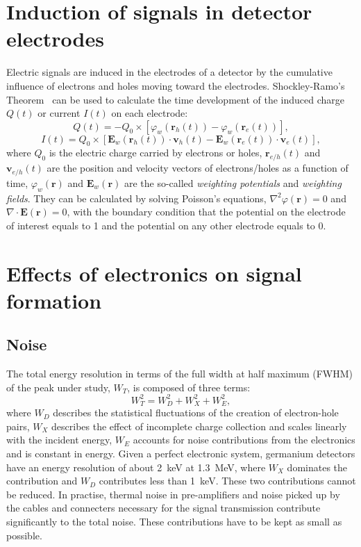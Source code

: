 \section{Induction of signals in detector electrodes}
\label{sec:det:lamo}
Electric signals are induced in the electrodes of a detector by the cumulative influence of electrons and holes moving toward the electrodes. Shockley-Ramo's Theorem~\cite{Gat82, Rad88, He00} can be used to calculate the time development of the induced charge $Q(t)$ or current $I(t)$ on each electrode:
\begin{equation} 
  \label{eq:det:ramoq}
  Q(t) = -Q_{0} \times [\varphi_{w}(\mathbf{r}_{h}(t)) - \varphi_{w}(\mathbf{r}_{e}(t))],
\end{equation}
\begin{equation} 
  \label{eq:det:ramoi}
  I(t) = Q_{0} \times [\mathbf{E}_{w}(\mathbf{r}_{h}(t)) \cdot \mathbf{v}_{h}(t) - \mathbf{E}_{w}(\mathbf{r}_{e}(t)) \cdot \mathbf{v}_{e}(t)],
\end{equation}
where $Q_{0}$ is the electric charge carried by electrons or holes, $\mathbf{r}_{e/h}(t)$ and $\mathbf{v}_{e/h}(t)$ are the position and velocity vectors of electrons/holes as a function of time, $\varphi_{w}(\mathbf{r})$ and $\mathbf{E}_{w}(\mathbf{r})$ are the so-called \emph{weighting potentials} and \emph{weighting fields}. They can be calculated by solving Poisson's equations, $\nabla^{2} \varphi(\mathbf{r}) = 0$ and $\nabla \cdot \mathbf{E}(\mathbf{r}) = 0$, with the boundary condition that the potential on the electrode of interest equals to 1 and the potential on any other electrode equals to 0.

\section{Effects of electronics on signal formation}
\label{sec:det:elec}

\subsection{Noise}
\label{sec:det:noise}
The total energy resolution in terms of the full width at half maximum
(FWHM) of the peak under study, $W_{T}$, is composed of three terms:
\begin{equation}
W_{T}^{2} = W_{D}^{2} + W_{X}^{2} + W_{E}^{2},
\end{equation}
where $W_{D}$ describes the statistical fluctuations of the creation of electron-hole pairs, $W_{X}$ describes the effect of incomplete charge collection and scales linearly with the incident energy, $W_{E}$ accounts for noise contributions from the electronics and is constant in energy. Given a perfect electronic system, germanium detectors have an energy resolution of about 2~keV at 1.3~MeV, where $W_{X}$ dominates the contribution and $W_{D}$ contributes less than 1~keV. These two contributions cannot be reduced. In practise, thermal noise in pre-amplifiers and noise picked up by the cables and connecters necessary for the signal transmission contribute significantly to the total noise. These contributions have to be kept as small as possible.

